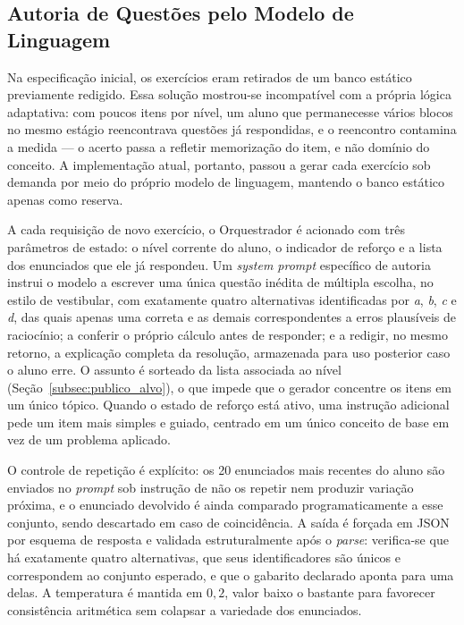 \documentclass[10pt, a4paper, twocolumn]{article}
\begin{document}
\subsection{Autoria de Questões pelo Modelo de Linguagem}
\label{subsec:autoria}

Na especificação inicial, os exercícios eram retirados de um banco estático
previamente redigido. Essa solução mostrou-se incompatível com a própria lógica
adaptativa: com poucos itens por nível, um aluno que permanecesse vários blocos
no mesmo estágio reencontrava questões já respondidas, e o reencontro contamina
a medida --- o acerto passa a refletir memorização do item, e não domínio do
conceito. A implementação atual, portanto, passou a gerar cada exercício sob
demanda por meio do próprio modelo de linguagem, mantendo o banco estático
apenas como reserva.

A cada requisição de novo exercício, o Orquestrador é acionado com três
parâmetros de estado: o nível corrente do aluno, o indicador de reforço e a
lista dos enunciados que ele já respondeu. Um \textit{system prompt} específico
de autoria instrui o modelo a escrever uma única questão inédita de múltipla
escolha, no estilo de vestibular, com exatamente quatro alternativas
identificadas por \textit{a}, \textit{b}, \textit{c} e \textit{d}, das quais
apenas uma correta e as demais correspondentes a erros plausíveis de raciocínio;
a conferir o próprio cálculo antes de responder; e a redigir, no mesmo retorno, a
explicação completa da resolução, armazenada para uso posterior caso o aluno
erre. O assunto é sorteado da lista associada ao nível
(Seção~\ref{subsec:publico_alvo}), o que impede que o gerador concentre os itens
em um único tópico. Quando o estado de reforço está ativo, uma instrução
adicional pede um item mais simples e guiado, centrado em um único conceito de
base em vez de um problema aplicado.

O controle de repetição é explícito: os 20 enunciados mais recentes do aluno são
enviados no \textit{prompt} sob instrução de não os repetir nem produzir
variação próxima, e o enunciado devolvido é ainda comparado programaticamente a
esse conjunto, sendo descartado em caso de coincidência. A saída é forçada em
JSON por esquema de resposta e validada estruturalmente após o \textit{parse}:
verifica-se que há exatamente quatro alternativas, que seus identificadores são
únicos e correspondem ao conjunto esperado, e que o gabarito declarado aponta
para uma delas. A temperatura é mantida em $0{,}2$, valor baixo o bastante para
favorecer consistência aritmética sem colapsar a variedade dos enunciados.
\end{document}
